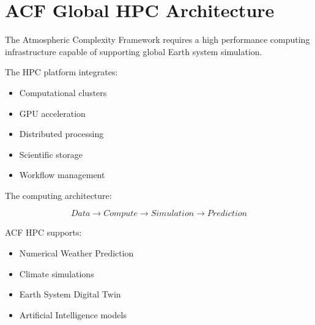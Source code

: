 \section{ACF Global HPC Architecture}


The Atmospheric Complexity Framework requires a high performance
computing infrastructure capable of supporting global Earth system
simulation.



The HPC platform integrates:


\begin{itemize}

\item Computational clusters

\item GPU acceleration

\item Distributed processing

\item Scientific storage

\item Workflow management

\end{itemize}



The computing architecture:


\[
Data
\rightarrow
Compute
\rightarrow
Simulation
\rightarrow
Prediction
\]


ACF HPC supports:


\begin{itemize}

\item Numerical Weather Prediction

\item Climate simulations

\item Earth System Digital Twin

\item Artificial Intelligence models

\end{itemize}
